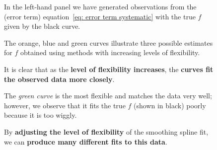 \documentclass[a4paper]{article}
\newcommand{\highspace}{\vspace{1.2em}\noindent}
\begin{document}
\begin{figure}[!htp]
\begin{examplebox}
\begin{center}
                \label{fig: measuring the quality of fit}
            \end{center}
            In the left-hand panel we have generated observations from the (error term) equation~\ref{eq: error term systematic} with the true $f$ given by the black curve. 
            
            The orange, blue and green curves illustrate three possible estimates for $f$ obtained using methods with increasing levels of flexibility.

            \highspace
            It is clear that as the \textbf{level of flexibility increases}, the \textbf{curves fit the observed data more closely}. 
            
            The \emph{green curve} is the most flexible and matches the data very well; however, we observe that it fits the true $f$ (shown in black) poorly because it is too wiggly. 
            
            By \textbf{adjusting the level of flexibility} of the smoothing spline fit, we can \textbf{produce many different fits to this data}.
        \end{examplebox}
    \end{figure}

    \setcounter{example}{9}
    \newpage
\end{document}
